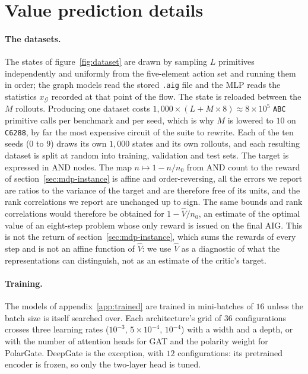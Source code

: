 \documentclass{article}
\begin{document}
\clearpage
\section{Value prediction details}\label{app:value-hp}
\paragraph{The datasets.} The states of figure~\ref{fig:dataset} are drawn by sampling $L$ primitives independently and uniformly from the five-element action set and running them in order; the graph models read the stored \texttt{.aig} file and the MLP reads the statistics $x_\mathcal{G}$ recorded at that point of the flow.
The state is reloaded between the $M$ rollouts.
Producing one dataset costs $1{,}000 \times (L + M \times 8) \approx 8\times 10^{5}$ \texttt{ABC} primitive calls per benchmark and per seed, which is why $M$ is lowered to $10$ on \texttt{C6288}, by far the most expensive circuit of the suite to rewrite.
Each of the ten seeds ($0$ to $9$) draws its own $1{,}000$ states and its own rollouts, and each resulting dataset is split at random into training, validation and test sets.
The target is expressed in AND nodes.
The map $n \mapsto 1 - n/n_0$ from AND count to the reward of section~\ref{sec:mdp-instance} is affine and order-reversing, all the errors we report are ratios to the variance of the target and are therefore free of its units, and the rank correlations we report are unchanged up to sign.
The same bounds and rank correlations would therefore be obtained for $1 - \widehat{V}/n_0$, an estimate of the optimal value of an eight-step problem whose only reward is issued on the final AIG.
This is not the return of section~\ref{sec:mdp-instance}, which sums the rewards of every step and is not an affine function of $\widehat{V}$: we use $\widehat{V}$ as a diagnostic of what the representations can distinguish, not as an estimate of the critic's target.

\paragraph{Training.} The models of appendix~\ref{app:trained} are trained in mini-batches of $16$ unless the batch size is itself searched over.
Each architecture's grid of $36$ configurations crosses three learning rates ($10^{-3}$, $5\times10^{-4}$, $10^{-4}$) with a width and a depth, or with the number of attention heads for GAT and the polarity weight for PolarGate.
DeepGate is the exception, with $12$ configurations: its pretrained encoder is frozen, so only the two-layer head is tuned.
\end{document}
